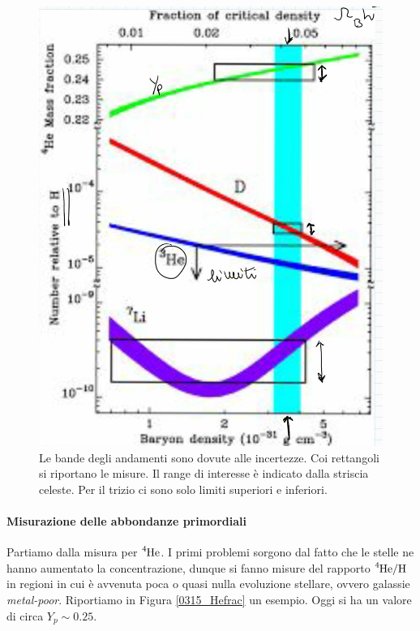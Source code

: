 \begin{figure}[h]
    \centering
    \includegraphics[scale=0.2]{Immagini/0315_massfraction2.png}
    \caption{Le bande degli andamenti sono dovute alle incertezze. Coi rettangoli si riportano le misure. Il range di interesse è indicato dalla striscia celeste. Per il trizio ci sono solo limiti superiori e inferiori.}
    \label{0315_mfrac2}
\end{figure}

\paragraph{Misurazione delle abbondanze primordiali} Partiamo dalla misura per $\ce{^4He}$. I primi problemi sorgono dal fatto che le stelle ne hanno aumentato la concentrazione, dunque si fanno misure del rapporto $\ce{^4He}/\ce{H}$ in regioni in cui è avvenuta poca o quasi nulla evoluzione stellare, ovvero galassie \textit{metal-poor}. Riportiamo in Figura \ref{0315_Hefrac} un esempio. Oggi si ha un valore di circa $Y_p \sim 0.25$.

